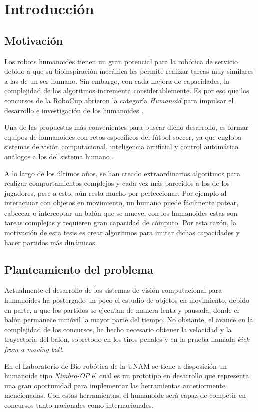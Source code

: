 \chapter{Introducción}

\section{Motivación}
	Los robots humanoides tienen un gran potencial para la robótica de servicio debido a que su bioinspiración mecánica les permite realizar tareas muy similares a las de un ser humano. Sin embargo, con cada mejora de capacidades, la complejidad de los algoritmos incrementa considerablemente. Es por eso que los concursos de la RoboCup abrieron la categoría \textit{Humanoid} para impulsar el desarrollo e investigación de los humanoides \citep{kitano1998robocup}.
	
	Una de las propuestas más convenientes para buscar dicho desarrollo, es formar equipos de humanoides con retos específicos del fútbol soccer, ya que engloba sistemas de visión computacional, inteligencia artificial y control automático análogos a los del sistema humano \citep{gerndt2015humanoid}.
		
	A lo largo de los últimos años, se han creado extraordinarios algoritmos para realizar comportamientos complejos y cada vez más parecidos a los de los jugadores, pese a esto, aún resta mucho por perfeccionar. Por ejemplo al interactuar con objetos en movimiento, un humano puede fácilmente patear, cabecear o interceptar un balón que se mueve, con los humanoides estas son tareas complejas y requieren gran capacidad de cómputo. 
	Por esta razón, la motivación de esta tesis es crear algoritmos para imitar dichas capacidades y hacer partidos más dinámicos.
	
\section{Planteamiento del problema}
	Actualmente el desarrollo de los sistemas de visión computacional para humanoides ha postergado un poco el estudio de objetos en movimiento, debido en parte, a que los partidos se ejecutan de manera lenta y pausada, donde el balón permanece inmóvil la mayor parte del tiempo. No obstante, el avance en la complejidad de los concursos, ha hecho necesario obtener la velocidad y la trayectoria del balón, sobretodo en los tiros penales y en la prueba llamada \textit{kick from a moving ball}.  

	En el Laboratorio de Bio-robótica de la UNAM se tiene a disposición un humanoide tipo \textit{Nimbro-OP} el cual es un prototipo en desarrollo que representa una gran oportunidad para implementar las herramientas anteriormente mencionadas. Con estas herramientas, el humanoide será capaz de competir en concursos tanto nacionales como internacionales.
	 

